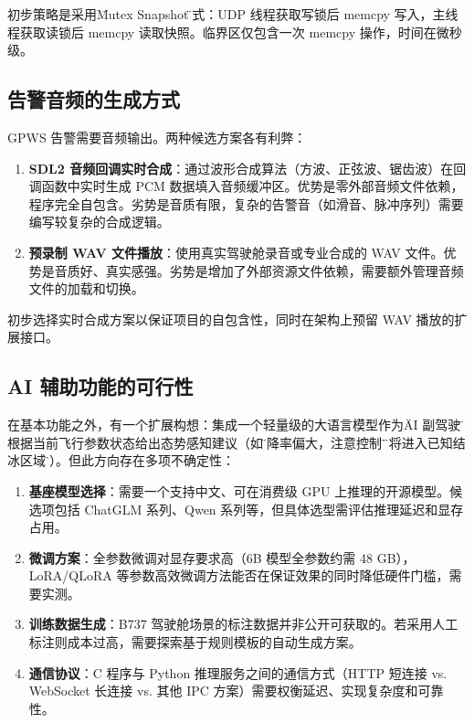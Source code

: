 \documentclass[12pt,a4paper]{ctexart}
\begin{document}
初步策略是采用\"Mutex Snapshot\"模式：UDP 线程获取写锁后 memcpy 写入，主线程获取读锁后 memcpy 读取快照。临界区仅包含一次 memcpy 操作，时间在微秒级。

\subsection{告警音频的生成方式}

GPWS 告警需要音频输出。两种候选方案各有利弊：

\begin{enumerate}[leftmargin=*]
    \item \textbf{SDL2 音频回调实时合成}：通过波形合成算法（方波、正弦波、锯齿波）在回调函数中实时生成 PCM 数据填入音频缓冲区。优势是零外部音频文件依赖，程序完全自包含。劣势是音质有限，复杂的告警音（如滑音、脉冲序列）需要编写较复杂的合成逻辑。
    \item \textbf{预录制 WAV 文件播放}：使用真实驾驶舱录音或专业合成的 WAV 文件。优势是音质好、真实感强。劣势是增加了外部资源文件依赖，需要额外管理音频文件的加载和切换。
\end{enumerate}

初步选择实时合成方案以保证项目的自包含性，同时在架构上预留 WAV 播放的扩展接口。

\subsection{AI 辅助功能的可行性}

在基本功能之外，有一个扩展构想：集成一个轻量级的大语言模型作为\"AI 副驾驶\"，根据当前飞行参数状态给出态势感知建议（如\"下降率偏大，注意控制\"、\"即将进入已知结冰区域\"等）。但此方向存在多项不确定性：

\begin{enumerate}[leftmargin=*]
    \item \textbf{基座模型选择}：需要一个支持中文、可在消费级 GPU 上推理的开源模型。候选项包括 ChatGLM 系列、Qwen 系列等，但具体选型需评估推理延迟和显存占用。
    \item \textbf{微调方案}：全参数微调对显存要求高（6B 模型全参数约需 48 GB），LoRA/QLoRA 等参数高效微调方法能否在保证效果的同时降低硬件门槛，需要实测。
    \item \textbf{训练数据生成}：B737 驾驶舱场景的标注数据并非公开可获取的。若采用人工标注则成本过高，需要探索基于规则模板的自动生成方案。
    \item \textbf{通信协议}：C 程序与 Python 推理服务之间的通信方式（HTTP 短连接 vs. WebSocket 长连接 vs. 其他 IPC 方案）需要权衡延迟、实现复杂度和可靠性。
\end{enumerate}
\end{document}

